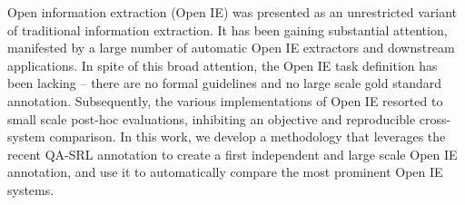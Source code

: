 Open information extraction (Open IE) was presented as an unrestricted variant of traditional information extraction. It has been gaining substantial attention, manifested by a large number of automatic Open IE extractors and downstream applications. In spite of this broad attention, the Open IE task definition has been lacking -- there are no formal guidelines and no large scale gold standard annotation. Subsequently, the various implementations of Open IE resorted to small scale post-hoc evaluations, inhibiting an objective and reproducible cross-system comparison. In this work, we develop a methodology that leverages the recent QA-SRL annotation to create a first independent and large scale Open IE annotation, and use it to automatically compare the most prominent Open IE systems.
